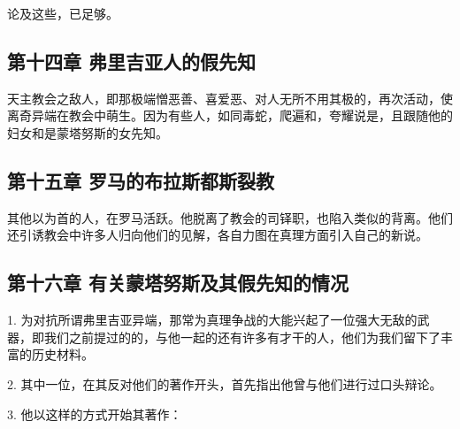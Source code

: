 论及这些，已足够。\par


\subsection{第十四章 弗里吉亚人的假先知}

天主教会之敌人，即那极端憎恶善、喜爱恶、对人无所不用其极的，再次活动，使离奇异端在教会中萌生。因为有些人，如同毒蛇，爬遍和，夸耀说是，且跟随他的妇女和是蒙塔努斯的女先知。\par


\subsection{第十五章 罗马的布拉斯都斯裂教}

其他以为首的人，在罗马活跃。他脱离了教会的司铎职，也陷入类似的背离。他们还引诱教会中许多人归向他们的见解，各自力图在真理方面引入自己的新说。\par


\subsection{第十六章 有关蒙塔努斯及其假先知的情况}

1. 为对抗所谓弗里吉亚异端，那常为真理争战的大能兴起了一位强大无敌的武器，即我们之前提过的的，与他一起的还有许多有才干的人，他们为我们留下了丰富的历史材料。\par

2. 其中一位，在其反对他们的著作开头，首先指出他曾与他们进行过口头辩论。\par

3. 他以这样的方式开始其著作：\par

\par

